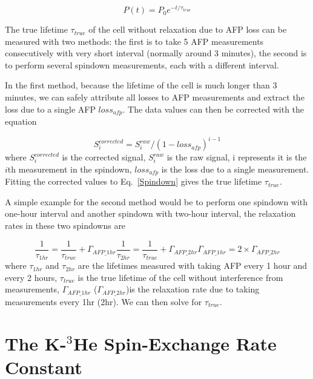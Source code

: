 \begin{equation}\label{Spindown}
P(t)=P_{0}e^{-t/\tau_{true}}
\end{equation}

The true lifetime $\tau_{true}$ of the cell without relaxation due to AFP loss can be measured with two methods: the first is to take 5 AFP measurements consecutively with very short interval (normally around 3 minutes), the second is to perform several spindown measurements, each with a different interval. 

In the first method, because the lifetime of the cell is much longer than 3 minutes, we can safely attribute all losses to AFP measurements and extract the loss due to a single AFP $loss_{afp}$. The data values can then be corrected with the equation

\begin{equation}
S_{i}^{corrected}=S_{i}^{raw}/(1-loss_{afp})^{i-1}
\end{equation}
where $S_{i}^{corrected}$ is the corrected signal, $S_{i}^{raw}$ is the raw signal, i represents it is the $i$th measurement in the spindown, $loss_{afp}$ is the loss due to a single measurement. Fitting the corrected values to Eq.~\ref{Spindown} gives the true lifetime $\tau_{true}$.

A simple example for the second method would be to perform one spindown with one-hour interval and another spindown with two-hour interval, the relaxation rates in these two spindowns are

\begin{subequations}
	\begin{equation}
	\frac{1}{\tau_{1hr}}=\frac{1}{\tau_{true}}+\Gamma_{AFP\_1hr}
	\end{equation}
	\begin{equation}
	\frac{1}{\tau_{2hr}}=\frac{1}{\tau_{true}}+\Gamma_{AFP\_2hr}
	\end{equation}
	\begin{equation}
	\Gamma_{AFP\_1hr}=2\times \Gamma_{AFP\_2hr}
	\end{equation}
\end{subequations}
where $\tau_{1hr}$ and $\tau_{2hr}$ are the lifetimes measured with taking AFP every 1 hour and every 2 hours, $\tau_{true}$ is the true lifetime of the cell without interference from measurements, $\Gamma_{AFP\_1hr}$ ($\Gamma_{AFP\_2hr}$)is the relaxation rate due to taking measurements every 1hr (2hr). We can then solve for $\tau_{true}$.

\section{The K-$^{3}$He Spin-Exchange Rate Constant}

